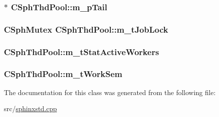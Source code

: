 \hypertarget{classCSphThdPool_aa02c54dedad8e47d3762d27e5855c2e7}{
\subsubsection[{m\-\_\-p\-Tail}]{$\ast$ C\-Sph\-Thd\-Pool\-::m\-\_\-p\-Tail\hspace{0.3cm}{\ttfamily [private]}}}\label{classCSphThdPool_aa02c54dedad8e47d3762d27e5855c2e7}
\hypertarget{classCSphThdPool_ab4817c7b59ea9af409e2930314958af6}{
\subsubsection[{m\-\_\-t\-Job\-Lock}]{\setlength{\rightskip}{0pt plus 5cm}C\-Sph\-Mutex C\-Sph\-Thd\-Pool\-::m\-\_\-t\-Job\-Lock\hspace{0.3cm}{\ttfamily [private]}}}\label{classCSphThdPool_ab4817c7b59ea9af409e2930314958af6}
\hypertarget{classCSphThdPool_a8c6655adc2a0a9d98bcffaf290c55bbc}{
\subsubsection[{m\-\_\-t\-Stat\-Active\-Workers}]{ C\-Sph\-Thd\-Pool\-::m\-\_\-t\-Stat\-Active\-Workers\hspace{0.3cm}{\ttfamily [private]}}}\label{classCSphThdPool_a8c6655adc2a0a9d98bcffaf290c55bbc}
\hypertarget{classCSphThdPool_a7c537b90f8b1fe6dfd684656fa030468}{
\subsubsection[{m\-\_\-t\-Work\-Sem}]{ C\-Sph\-Thd\-Pool\-::m\-\_\-t\-Work\-Sem\hspace{0.3cm}{\ttfamily [private]}}}\label{classCSphThdPool_a7c537b90f8b1fe6dfd684656fa030468}


The documentation for this class was generated from the following file\-:\begin{DoxyCompactItemize}
\item 
src/\hyperlink{sphinxstd_8cpp}{sphinxstd.\-cpp}\end{DoxyCompactItemize}
